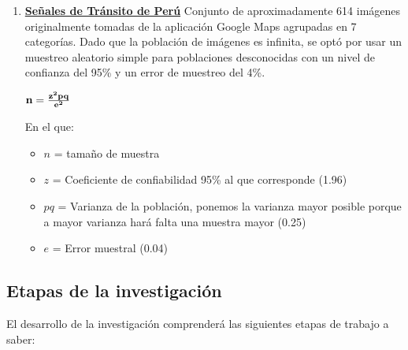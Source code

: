 		
		\begin{enumerate}
			\item[]  {\bf \underline {Señales de Tránsito de Perú}}\newline
			Conjunto de aproximadamente 614 imágenes originalmente tomadas de la aplicación Google Maps agrupadas en 7 categorías. Dado que la población de imágenes es infinita, se optó por usar un muestreo aleatorio simple para poblaciones desconocidas con un nivel de confianza del 95\% y un error de muestreo del 4\%.
		
			\vskip 0.4cm
			\begingroup\makeatletter{}\check@mathfonts
			\begin{center}
				${\bf n} ={\bf \frac{z^2pq}{e^2}}$
			\end{center}
			\endgroup
		
			En el que:\vskip 0.1cm
			\begin{itemize}
				\item $n$ = tamaño de muestra
				\item $z$ = Coeficiente de confiabilidad 95\% al que corresponde (1.96)
				\item $pq$ = Varianza de la población, ponemos la varianza mayor posible porque a mayor varianza hará falta una muestra mayor (0.25)
				\item $e$ = Error muestral (0.04)
			\end{itemize}
		\end{enumerate}

\subsection{Etapas de la investigación} 
	El desarrollo de la investigación comprenderá las siguientes etapas de trabajo a saber:

